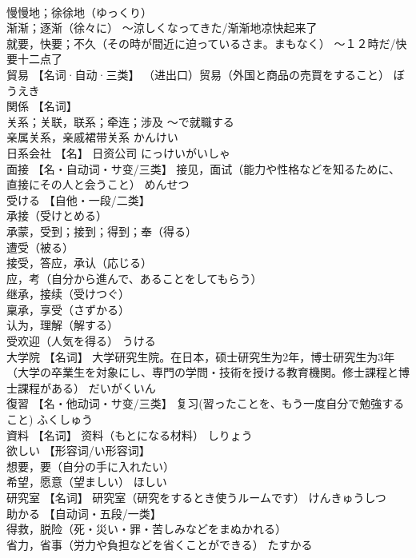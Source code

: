 \documentclass[8pt]{extreport}
\begin{document}
\begin{CJK}{UTF8}{min}
\\	慢慢地；徐徐地（ゆっくり） 
\\	渐渐；逐渐（徐々に） 〜涼しくなってきた/渐渐地凉快起来了 
\\	就要，快要；不久（その時が間近に迫っているさま。まもなく） 〜１２時だ/快要十二点了		
\\	貿易	【名词·自动·三类】 （进出口）贸易（外国と商品の売買をすること）	ぼうえき	
\\	関係	【名词】 
\\	关系；关联，联系；牵连；涉及 〜で就職する 
\\	亲属关系，亲戚裙带关系	かんけい	
\\	日系会社	【名】 日资公司	にっけいがいしゃ	
\\	面接	【名・自动词・サ变/三类】 接见，面试（能力や性格などを知るために、直接にその人と会うこと）	めんせつ	
\\	受ける	【自他・一段/二类】 
\\	承接（受けとめる） 
\\	承蒙，受到；接到；得到；奉（得る） 
\\	遭受（被る） 
\\	接受，答应，承认（応じる） 
\\	应，考（自分から進んで、あることをしてもらう） 
\\	继承，接续（受けつぐ） 
\\	稟承，享受（さずかる） 
\\	认为，理解（解する） 
\\	受欢迎（人気を得る）	うける	
\\	大学院	【名词】 大学研究生院。在日本，硕士研究生为2年，博士研究生为3年（大学の卒業生を対象にし、専門の学問・技術を授ける教育機関。修士課程と博士課程がある）	だいがくいん	
\\	復習	【名・他动词・サ变/三类】 复习(習ったことを、もう一度自分で勉強すること)	ふくしゅう	
\\	資料	【名词】 资料（もとになる材料）	しりょう	
\\	欲しい	【形容词/い形容词】 
\\	想要，要（自分の手に入れたい） 
\\	希望，愿意（望ましい）	ほしい	
\\	研究室	【名词】 研究室（研究をするとき使うルームです）	けんきゅうしつ	
\\	助かる	【自动词・五段/一类】 
\\	得救，脱险（死・災い・罪・苦しみなどをまぬかれる） 
\\	省力，省事（労力や負担などを省くことができる）	たすかる	

\end{CJK}
\end{document}
